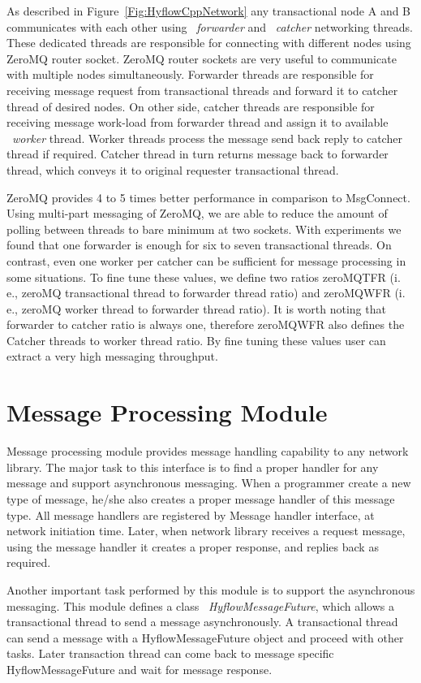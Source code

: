 \documentclass[12pt,english]{report}
\begin{document}
As described in Figure~\ref{Fig:HyflowCppNetwork} any transactional node A and B communicates with each other using ~\emph{forwarder} and ~\emph{catcher} networking threads. These dedicated threads are responsible for connecting with different nodes using ZeroMQ router socket. ZeroMQ router sockets are very useful to communicate with multiple nodes simultaneously. Forwarder threads are responsible for receiving message request from transactional threads and forward it to catcher thread of desired nodes. On other side, catcher threads are responsible for receiving message work-load from forwarder thread and assign it to available ~\emph{worker} thread. Worker threads process the message send back reply to catcher thread if required. Catcher thread in turn returns message back to forwarder thread, which conveys it to original requester transactional thread.

ZeroMQ provides 4 to 5 times better performance in comparison to MsgConnect. Using multi-part messaging of ZeroMQ, we are able to reduce the amount of polling between threads to bare minimum at two sockets. With experiments we found that one forwarder is enough for six to seven transactional threads. On contrast, even one worker per catcher can be sufficient for message processing in some situations. To fine tune these values, we define two ratios zeroMQTFR (i. e., zeroMQ transactional thread to forwarder thread ratio) and zeroMQWFR (i. e., zeroMQ worker thread to forwarder thread ratio). It is worth noting that forwarder to catcher ratio is always one, therefore zeroMQWFR also defines the Catcher threads to worker thread ratio. By fine tuning these values user can extract a very high messaging throughput.

\section{Message Processing Module}

Message processing module provides message handling capability to any network library. The major task to this interface is to find a proper handler for any message and support asynchronous messaging. When a programmer create a new type of message, he/she also creates a proper message handler of this message type. All message handlers are registered by Message handler interface, at network initiation time. Later, when network library receives a request message, using the message handler it creates a proper response, and replies back as required.

Another important task performed by this module is to support the asynchronous messaging. This module defines a class ~\emph{HyflowMessageFuture}, which allows a transactional thread to send a message asynchronously. A transactional thread can send a message with a HyflowMessageFuture object and proceed with other tasks. Later transaction thread can come back to message specific HyflowMessageFuture and wait for message response. 
\end{document}
